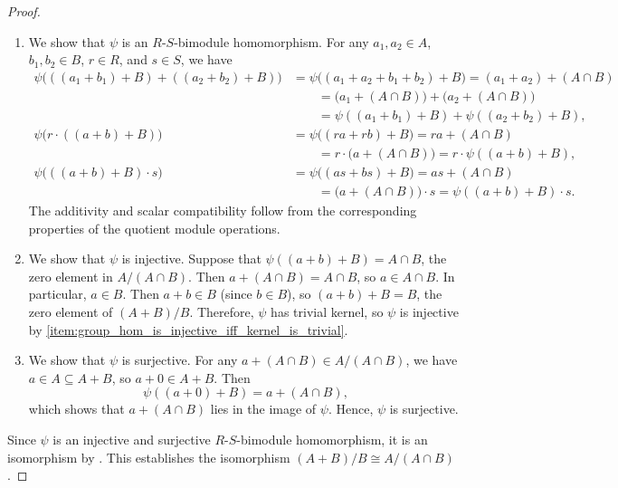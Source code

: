 \begin{proof}
\begin{enumerate}
        \item We show that $\psi$ is an $R$-$S$-bimodule homomorphism. For any $a_1, a_2 \in A$, $b_1, b_2 \in B$, $r \in R$, and $s \in S$, we have
        \begin{align*}
        \psi\bigl(((a_1 + b_1) + B) + ((a_2 + b_2) + B)\bigr) &= \psi\bigl((a_1 + a_2 + b_1 + b_2) + B\bigr) = (a_1 + a_2) + (A \cap B) \\
        &\qquad = \bigl(a_1 + (A \cap B)\bigr) + \bigl(a_2 + (A \cap B)\bigr) \\
        &\qquad = \psi((a_1 + b_1) + B) + \psi((a_2 + b_2) + B), \\
        \psi\bigl(r \cdot ((a + b) + B)\bigr) &= \psi\bigl((ra + rb) + B\bigr) = ra + (A \cap B) \\
        &\qquad = r \cdot \bigl(a + (A \cap B)\bigr) = r \cdot \psi((a + b) + B), \\
        \psi\bigl(((a + b) + B) \cdot s\bigr) &= \psi\bigl((as + bs) + B\bigr) = as + (A \cap B) \\
        &\qquad = \bigl(a + (A \cap B)\bigr) \cdot s = \psi((a + b) + B) \cdot s.
        \end{align*}
        The additivity and scalar compatibility follow from the corresponding properties of the quotient module operations.

        \item We show that $\psi$ is injective. Suppose that $\psi((a + b) + B) = A \cap B$, the zero element in $A/(A \cap B)$. Then $a + (A \cap B) = A \cap B$, so $a \in A \cap B$. In particular, $a \in B$. Then $a + b \in B$ (since $b \in B$), so $(a + b) + B = B$, the zero element of $(A + B)/B$. Therefore, $\psi$ has trivial kernel, so $\psi$ is injective by \eqref{item:group_hom_is_injective_iff_kernel_is_trivial}.

        \item We show that $\psi$ is surjective. For any $a + (A \cap B) \in A/(A \cap B)$, we have $a \in A \subseteq A + B$, so $a + 0 \in A + B$. Then
        $$\psi((a + 0) + B) = a + (A \cap B),$$
        which shows that $a + (A \cap B)$ lies in the image of $\psi$. Hence, $\psi$ is surjective.
    \end{enumerate}

    Since $\psi$ is an injective and surjective $R$-$S$-bimodule homomorphism, it is an isomorphism by . This establishes the isomorphism $(A + B)/B \cong A/(A \cap B)$.
\end{proof}